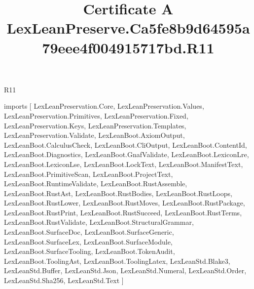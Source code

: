\begin{lexlean}{R11}
\title{Certificate A LexLeanPreserve.Ca5fe8b9d64595a79eee4f004915717bd.R11}
\begin{coremodule}
imports [
  LexLeanPreservation.Core,
  LexLeanPreservation.Values,
  LexLeanPreservation.Primitives,
  LexLeanPreservation.Fixed,
  LexLeanPreservation.Keys,
  LexLeanPreservation.Templates,
  LexLeanPreservation.Validate,
  LexLeanBoot.AxiomOutput,
  LexLeanBoot.CalculusCheck,
  LexLeanBoot.CliOutput,
  LexLeanBoot.ContentId,
  LexLeanBoot.Diagnostics,
  LexLeanBoot.GnafValidate,
  LexLeanBoot.LexiconLre,
  LexLeanBoot.LexiconLse,
  LexLeanBoot.LockText,
  LexLeanBoot.ManifestText,
  LexLeanBoot.PrimitiveScan,
  LexLeanBoot.ProjectText,
  LexLeanBoot.RuntimeValidate,
  LexLeanBoot.RustAssemble,
  LexLeanBoot.RustAst,
  LexLeanBoot.RustBodies,
  LexLeanBoot.RustLoops,
  LexLeanBoot.RustLower,
  LexLeanBoot.RustMoves,
  LexLeanBoot.RustPackage,
  LexLeanBoot.RustPrint,
  LexLeanBoot.RustSucceed,
  LexLeanBoot.RustTerms,
  LexLeanBoot.RustValidate,
  LexLeanBoot.StructuralGrammar,
  LexLeanBoot.SurfaceDoc,
  LexLeanBoot.SurfaceGeneric,
  LexLeanBoot.SurfaceLex,
  LexLeanBoot.SurfaceModule,
  LexLeanBoot.SurfaceTooling,
  LexLeanBoot.TokenAudit,
  LexLeanBoot.ToolingAst,
  LexLeanBoot.ToolingLatex,
  LexLeanStd.Blake3,
  LexLeanStd.Buffer,
  LexLeanStd.Json,
  LexLeanStd.Numeral,
  LexLeanStd.Order,
  LexLeanStd.Sha256,
  LexLeanStd.Text
]


\end{coremodule}
\end{lexlean}
